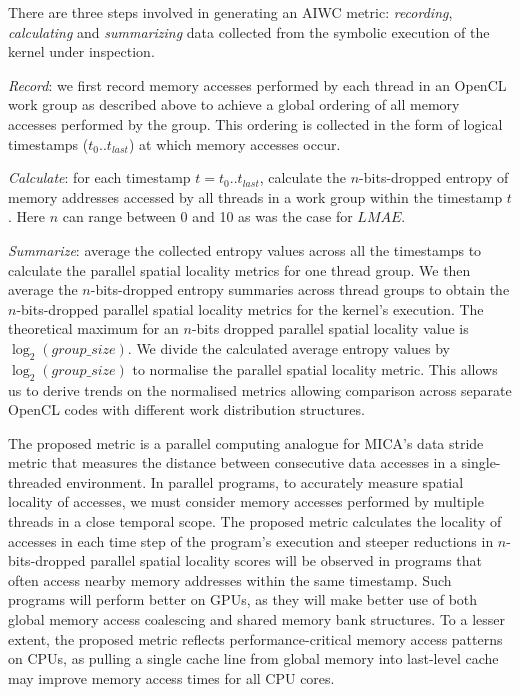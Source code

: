 \documentclass[review=false, sigchi]{acmart}
\begin{document}
	There are three steps involved in generating an AIWC metric: \textit{recording}, \textit{calculating} and \textit{summarizing} data collected from the symbolic execution of the kernel under inspection.
	
	\textit{Record}: we first record memory accesses performed by each thread in an OpenCL work group as described above to achieve a global ordering of all memory accesses performed by the group.
	This ordering is collected in the form of logical timestamps ($t_0 .. t_{last}$) at which memory accesses occur.
	
	\textit{Calculate}: for each timestamp $t = t_0 .. t_{last}$, calculate the $n$-bits-dropped entropy of memory addresses accessed by all threads in a work group within the timestamp $t$. Here $n$ can range between 0 and 10 as was the case for $LMAE$.
	
	\textit{Summarize}: average the collected entropy values across all the timestamps to calculate the parallel spatial locality metrics for one thread group. We then average the $n$-bits-dropped entropy summaries across thread groups to obtain the $n$-bits-dropped parallel spatial locality metrics for the kernel's execution. The theoretical maximum for an $n$-bits dropped parallel spatial locality value is $\log_2(group\_size)$. We divide the calculated average entropy values by $\log_2 (group\_size)$ to normalise the parallel spatial locality metric. This allows us to derive trends on the normalised metrics allowing comparison across separate OpenCL codes with different work distribution structures.
	
	

	The proposed metric is a parallel computing analogue for MICA's data stride metric that measures the distance between consecutive data accesses in a single-threaded environment. 
	In parallel programs, to accurately measure spatial locality of accesses, we must consider memory accesses performed by multiple threads in a close temporal scope. 
	The proposed metric calculates the locality of accesses in each time step of the program's execution and steeper reductions in $n$-bits-dropped parallel spatial locality scores will be observed in programs that often access nearby memory addresses within the same timestamp.
	Such programs will perform better on GPUs, as they will make better use of both global memory access coalescing and shared memory bank structures.
	To a lesser extent, the proposed metric reflects performance-critical memory access patterns on CPUs, as pulling a single cache line from global memory into last-level cache may improve memory access times for all CPU cores.
	
\end{document}
